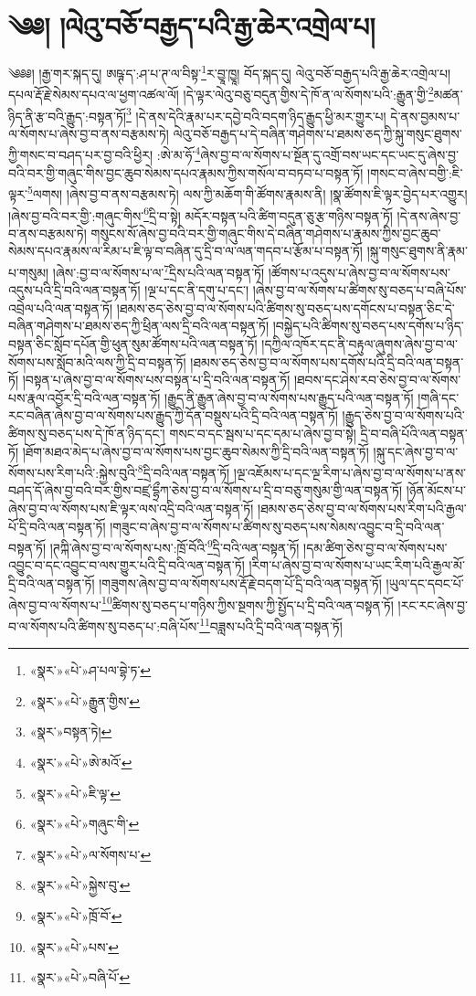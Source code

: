 \chapter{༄༅། །ལེའུ་བཅོ་བརྒྱད་པའི་རྒྱ་ཆེར་འགྲེལ་པ།}༄༅༅། །རྒྱ་གར་སྐད་དུ། ཨཥྚ་ད་:ཤ་པ་ཊ་ལ་བིསྟ་\footnote{«སྣར་»«པེ་»ཤ་པལ་བྷེ་ཏ་}ར་བྱཱ་ཁྱཱ། བོད་སྐད་དུ། ལེའུ་བཅོ་བརྒྱད་པའི་རྒྱ་ཆེར་འགྲེལ་པ། དཔལ་རྡོ་རྗེ་སེམས་དཔའ་ལ་ཕྱག་འཚལ་ལོ། །དེ་ལྟར་ལེའུ་བཅུ་བདུན་གྱིས་དེ་ཁོ་ན་ལ་སོགས་པའི་:རྒྱུན་གྱི་\footnote{«སྣར་»«པེ་»རྒྱུན་གྱིས་}མཚན་ཉིད་ནི་རྩ་བའི་རྒྱུད་:བསྟན་ཏོ།\footnote{«སྣར་»བསྟན་ཏེ།} །དེ་ནས་དེའི་རྣམ་པར་དབྱེ་བའི་བདག་ཉིད་རྒྱུད་ཕྱི་མར་གྱུར་པ། དེ་ནས་བྱམས་པ་ལ་སོགས་པ་ཞེས་བྱ་བ་ནས་བརྩམས་ཏེ། ལེའུ་བཅོ་བརྒྱད་པ་དེ་བཞིན་གཤེགས་པ་ཐམས་ཅད་ཀྱི་སྐུ་གསུང་ཐུགས་ཀྱི་གསང་བ་བཤད་པར་བྱ་བའི་ཕྱིར། :ཨེ་མ་ཧོ་\footnote{«སྣར་»«པེ་»ཨེ་མའོ་}ཞེས་བྱ་བ་ལ་སོགས་པ་སྔོན་དུ་འགྲོ་བས་ཡང་དང་ཡང་དུ་ཞེས་བྱ་བའི་བར་གྱི་གཞུང་གིས་བྱང་ཆུབ་སེམས་དཔའ་རྣམས་ཀྱིས་གསོལ་བ་བཏབ་པ་བསྟན་ཏོ། །གསང་བ་ཞེས་བགྱི་:ཇི་ལྟར་\footnote{«སྣར་»«པེ་»ཇི་ལྟ་}ལགས། །ཞེས་བྱ་བ་ནས་བརྩམས་ཏེ། ལས་ཀྱི་མཆོག་གི་ཚོགས་རྣམས་ནི། །སྣ་ཚོགས་ཇི་ལྟར་བྱེད་པར་འགྱུར། །ཞེས་བྱ་བའི་བར་གྱི་:གཞུང་གིས་\footnote{«སྣར་»«པེ་»གཞུང་གི་}དྲི་བ་སྟེ། མདོར་བསྟན་པའི་ཚིག་བདུན་ཅུ་རྩ་གཉིས་བསྟན་ཏོ། །དེ་ནས་ཞེས་བྱ་བ་ནས་བརྩམས་ཏེ། གསུངས་སོ་ཞེས་བྱ་བའི་བར་གྱི་གཞུང་གིས་དེ་བཞིན་གཤེགས་པ་རྣམས་ཀྱིས་བྱང་ཆུབ་སེམས་དཔའ་རྣམས་ལ་རིམ་པ་ཇི་ལྟ་བ་བཞིན་དུ་དྲི་བ་ལ་ལན་གདབ་པ་རྩོམ་པ་བསྟན་ཏོ། །སྐུ་གསུང་ཐུགས་ནི་རྣམ་པ་གསུམ། །ཞེས་:བྱ་བ་ལ་སོགས་པ་ལ་\footnote{«སྣར་»«པེ་»ལ་སོགས་པ་}དྲིས་པའི་ལན་བསྟན་ཏོ། །ཚོགས་པ་འདུས་པ་ཞེས་བྱ་བ་ལ་སོགས་པས་འདུས་པའི་དྲི་བའི་ལན་བསྟན་ཏོ། །ལྔ་པ་དང་ནི་དགུ་པ་དང་། །ཞེས་བྱ་བ་ལ་སོགས་པ་ཚིགས་སུ་བཅད་པ་བཞི་པོས་འབྲེལ་པའི་ལན་བསྟན་ཏོ། །ཐམས་ཅད་ཅེས་བྱ་བ་ལ་སོགས་པའི་ཚིགས་སུ་བཅད་པས་དགོངས་པ་བསྟན་ཅིང་དེ་བཞིན་གཤེགས་པ་ཐམས་ཅད་ཀྱི་ཕྲིན་ལས་དྲི་བའི་ལན་བསྟན་ཏོ། །བསྐྱེད་པའི་ཚིགས་སུ་བཅད་པས་དགོས་པ་ཉིད་བསྟན་ཅིང་སློབ་དཔོན་གྱི་ཕུན་སུམ་ཚོགས་པའི་ལན་བསྟན་ཏོ། །དཀྱིལ་འཁོར་དང་ནི་བརྟུལ་ཞུགས་ཞེས་བྱ་བ་ལ་སོགས་པས་སློབ་མའི་ལས་ཀྱི་དྲི་བ་བསྟན་ཏོ། །ཐམས་ཅད་ཅེས་བྱ་བ་ལ་སོགས་པས་དགོས་པའི་དྲི་བའི་ལན་བསྟན་ཏོ། །བསྟན་པ་ཞེས་བྱ་བ་ལ་སོགས་པས་བསྟན་པ་དྲི་བའི་ལན་བསྟན་ཏོ། །ཐབས་དང་ཤེས་རབ་ཅེས་བྱ་བ་ལ་སོགས་པས་རྣལ་འབྱོར་དྲི་བའི་ལན་བསྟན་ཏོ། །རྒྱུད་ནི་རྒྱུན་ཞེས་བྱ་བ་ལ་སོགས་པས་རྒྱུད་པའི་ལན་བསྟན་ཏོ། །གཞི་དང་རང་བཞིན་ཞེས་བྱ་བ་ལ་སོགས་པས་རྒྱུད་ཀྱི་དོན་བསྡུས་པའི་དྲི་བའི་ལན་བསྟན་ཏོ། །རྒྱུད་ཅེས་བྱ་བ་ལ་སོགས་པའི་ཚིགས་སུ་བཅད་པས་དེ་ཁོ་ན་ཉིད་དང་། གསང་བ་དང་སྦས་པ་དང་དམ་པ་ཞེས་བྱ་བ་སྟེ། དྲི་བ་བཞི་པོའི་ལན་བསྟན་ཏོ། །ཐོག་མཐའ་མེད་པ་ཞེས་བྱ་བ་ལ་སོགས་པས་བྱང་ཆུབ་སེམས་ཀྱི་དྲི་བའི་ལན་བསྟན་ཏོ། །སྐུ་དང་ཞེས་བྱ་བ་ལ་སོགས་པས་རིག་པའི་:སྐྱེས་བུའི་\footnote{«སྣར་»«པེ་»སྐྱེས་བུ་}དྲི་བའི་ལན་བསྟན་ཏོ། །ལྔ་འཇོམས་པ་དང་ལྔ་རིག་པ་ཞེས་བྱ་བ་ལ་སོགས་པ་ནས་བཤད་དོ་ཞེས་བྱ་བའི་བར་གྱིས་བཛྲ་དྷྲྀཀ་ཅེས་བྱ་བ་ལ་སོགས་པ་དྲི་བ་བཅུ་གསུམ་གྱི་ལན་བསྟན་ཏོ། །ཉོན་མོངས་པ་ཞེས་བྱ་བ་ལ་སོགས་པས་ཇི་ལྟར་ལས་འདྲི་བའི་ལན་བསྟན་ཏོ། །ཐམས་ཅད་ཅེས་བྱ་བ་ལ་སོགས་པས་རིག་པའི་རྒྱལ་པོ་དྲི་བའི་ལན་བསྟན་ཏོ། །གཟུང་བ་ཞེས་བྱ་བ་ལ་སོགས་པ་ཚིགས་སུ་བཅད་པས་སེམས་འབྱུང་བ་དྲི་བའི་ལན་བསྟན་ཏོ། །ཊཀྐི་ཞེས་བྱ་བ་ལ་སོགས་པས་:ཁྲོ་བོའི་\footnote{«སྣར་»«པེ་»ཁྲོ་བོ་}དྲི་བའི་ལན་བསྟན་ཏོ། །དམ་ཚིག་ཅེས་བྱ་བ་ལ་སོགས་པས་འབྱུང་བ་དང་འབྱུང་བ་ལས་གྱུར་པའི་དྲི་བའི་ལན་བསྟན་ཏོ། །རིག་པ་ཞེས་བྱ་བ་ལ་སོགས་པ་ཡང་རིག་པའི་རྒྱལ་མོ་དྲི་བའི་ལན་བསྟན་ཏོ། །གཟུགས་ཞེས་བྱ་བ་ལ་སོགས་པས་རྡོ་རྗེ་བདག་པོ་དྲི་བའི་ལན་བསྟན་ཏོ། །ཡུལ་དང་དབང་པོ་ཞེས་བྱ་བ་ལ་སོགས་པ་\footnote{«སྣར་»«པེ་»པས་}ཚིགས་སུ་བཅད་པ་གཉིས་ཀྱིས་སྔགས་ཀྱི་སྤྱོད་པ་དྲི་བའི་ལན་བསྟན་ཏོ། །རང་རང་ཞེས་བྱ་བ་ལ་སོགས་པའི་ཚིགས་སུ་བཅད་པ་:བཞི་པོས་\footnote{«སྣར་»«པེ་»བཞི་པོ་}བཟླས་པའི་དྲི་བའི་ལན་བསྟན་ཏོ། 